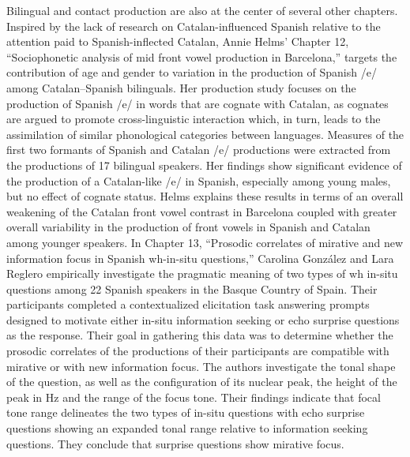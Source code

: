 \documentclass[output=paper,draftmode]{langscibook}
\begin{document}
Bilingual and contact production are also at the center of several other chapters. Inspired by the lack of research on Catalan-influenced Spanish relative to the attention paid to Spanish-inflected Catalan, Annie Helms’ Chapter 12, “Sociophonetic analysis of mid front vowel production in Barcelona,” targets the contribution of age and gender to variation in the production of Spanish /e/ among Catalan–Spanish bilinguals. Her production study focuses on the production of Spanish /e/ in words that are cognate with Catalan, as cognates are argued to promote cross-linguistic interaction which, in turn, leads to the assimilation of similar phonological categories between languages. Measures of the first two formants of Spanish and Catalan /e/ productions were extracted from the productions of 17 bilingual speakers. Her findings show significant evidence of the production of a Catalan-like /e/ in Spanish, especially among young males, but no effect of cognate status. Helms explains these results in terms of an overall weakening of the Catalan front vowel contrast in Barcelona coupled with greater overall variability in the production of front vowels in Spanish and Catalan among younger speakers. In Chapter 13, “Prosodic correlates of mirative and new information focus in Spanish wh-in-situ questions,” Carolina González and Lara Reglero empirically investigate the pragmatic meaning of two types of wh in-situ questions among 22 Spanish speakers in the Basque Country of Spain.  Their participants completed a contextualized elicitation task answering prompts designed to motivate either in-situ information seeking or echo surprise questions as the response.  Their goal in gathering this data was to determine whether the prosodic correlates of the productions of their participants are compatible with mirative or with new information focus. The authors investigate the tonal shape of the question, as well as the configuration of its nuclear peak, the height of the peak in Hz and the range of the focus tone. Their findings indicate that focal tone range delineates the two types of in-situ questions with echo surprise questions showing an expanded tonal range relative to information seeking questions. They conclude that surprise questions show mirative focus.
\end{document}
